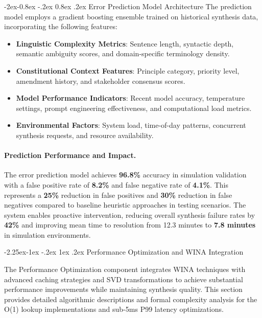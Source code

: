 \documentclass[manuscript,screen,9pt]{acmart}
\makeatletter
\renewcommand\subsection{\@startsection{subsection}{2}{\z@}%
  {-2.25ex\@plus -1ex \@minus -.2ex}%
  {1ex \@plus .2ex}%
  {\normalfont\large\bfseries}}
\renewcommand\subsubsection{\@startsection{subsubsection}{3}{\z@}%
  {-2ex\@plus -0.8ex \@minus -.2ex}%
  {0.8ex \@plus .2ex}%
  {\normalfont\normalsize\bfseries}}
\makeatother
\begin{document}
\subsubsection{Error Prediction Model Architecture}
The prediction model employs a gradient boosting ensemble trained on historical synthesis data, incorporating the following features:

\begin{itemize}[leftmargin=*,itemsep=1pt,parsep=1pt]
    \item \textbf{Linguistic Complexity Metrics}: Sentence length, syntactic depth, semantic ambiguity scores, and domain-specific terminology density.
    \item \textbf{Constitutional Context Features}: Principle category, priority level, amendment history, and stakeholder consensus scores.
    \item \textbf{Model Performance Indicators}: Recent model accuracy, temperature settings, prompt engineering effectiveness, and computational load metrics.
    \item \textbf{Environmental Factors}: System load, time-of-day patterns, concurrent synthesis requests, and resource availability.
\end{itemize}

\paragraph{Prediction Performance and Impact.} The error prediction model achieves \textbf{96.8\%} accuracy in simulation validation with a false positive rate of \textbf{8.2\%} and false negative rate of \textbf{4.1\%}. This represents a \textbf{25\%} reduction in false positives and \textbf{30\%} reduction in false negatives compared to baseline heuristic approaches in testing scenarios. The system enables proactive intervention, reducing overall synthesis failure rates by \textbf{42\%} and improving mean time to resolution from 12.3 minutes to \textbf{7.8 minutes} in simulation environments.

\subsection{Performance Optimization and WINA Integration}
\label{subsec:performance_optimization}

The Performance Optimization component integrates WINA techniques with advanced caching strategies and SVD transformations to achieve substantial performance improvements while maintaining synthesis quality. This section provides detailed algorithmic descriptions and formal complexity analysis for the O(1) lookup implementations and sub-5ms P99 latency optimizations.
\end{document}
